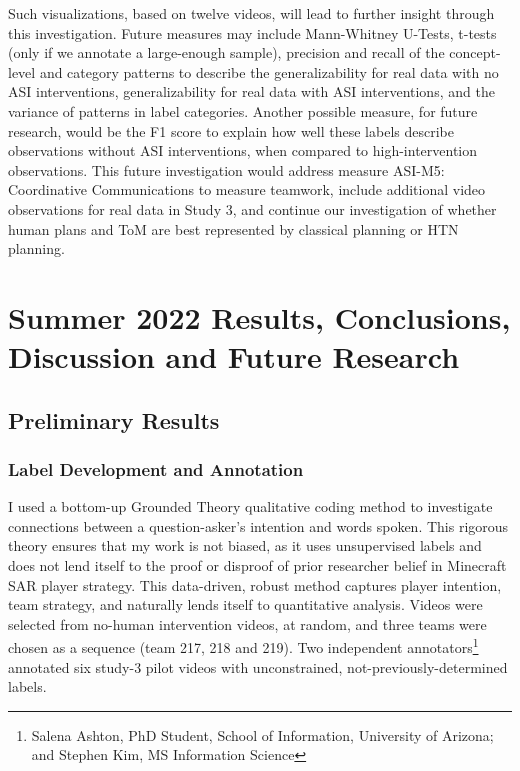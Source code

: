 Such visualizations, based on twelve videos, will lead to further insight
through this investigation. Future measures may include Mann-Whitney U-Tests,
t-tests (only if we annotate a large-enough sample), precision and recall of
the concept-level and category patterns to describe the generalizability for
real data with no ASI interventions, generalizability for real data with ASI
interventions, and the variance of patterns in label categories. Another
possible measure, for future research, would be the F1 score to explain how
well these labels describe observations without ASI interventions, when
compared to high-intervention observations. This future investigation would
address measure ASI-M5: Coordinative Communications to
measure teamwork, include additional video observations for real data in Study
3, and continue our investigation of whether human plans and ToM are best
represented by classical planning or HTN planning.


\section{Summer 2022 Results, Conclusions, Discussion and Future Research}
\subsection{Preliminary Results}
\subsubsection{Label Development and Annotation}

I used a bottom-up Grounded Theory qualitative coding method to investigate connections between a question-asker's intention and words spoken. This
rigorous theory ensures that my work is not biased, as it uses unsupervised
labels and does not lend itself to the proof or disproof of prior researcher
belief in Minecraft SAR player strategy. This data-driven, robust method
captures player intention, team strategy, and naturally lends itself to
quantitative analysis. Videos were selected from no-human intervention videos,
at random, and three teams were chosen as a sequence (team 217, 218 and 219).
Two independent annotators\footnote{Salena Ashton, PhD Student, School of Information, University of Arizona; and Stephen Kim, MS Information Science} annotated six study-3 pilot
videos with unconstrained, not-previously-determined labels. 

